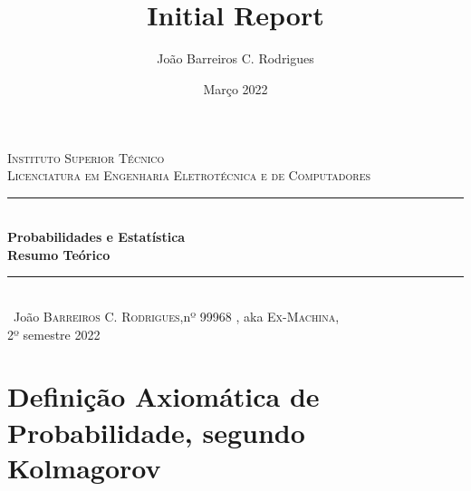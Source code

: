 \documentclass[a4paper,12pt]{article}
\date{Março 2022}
\title{ \\ \large {Initial Report}}
\author{João Barreiros C. Rodrigues}
\begin{document}
        \begin{titlepage} %
        \newcommand{\HRule}{\rule{\linewidth}{0.5mm}} %
        \center %
        \textsc{\LARGE Instituto Superior Técnico}\\[1.5cm] %
        \textsc{\Large Licenciatura em Engenharia Eletrotécnica e de Computadores}\\[0.25cm]
        \HRule\\[0.4cm]
        {\LARGE\bfseries Probabilidades e Estatística}\\[0.4cm] %
        {\huge\bfseries Resumo Teórico}\\[0.4cm] %
        \HRule\\[1.5cm]\
        João \textsc{Barreiros C. Rodrigues},nº 99968 , aka \textsc{Ex-Machina},\\
        \vfill\vfill\vfill %
        {\large 2º semestre 2022} %
        \vfill %
\end{titlepage}
        \newpage
        \tableofcontents
        \clearpage
        \section{Definição Axiomática de Probabilidade, segundo Kolmagorov}
                \par
\end{document}
